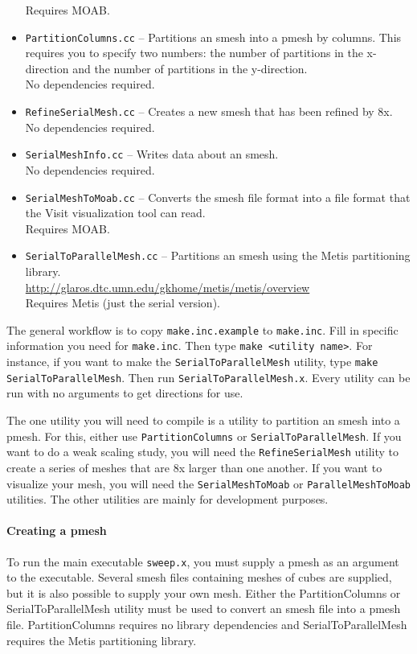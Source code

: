 \documentclass[12pt,letterpaper]{article}
\begin{document}
\begin{itemize}
{\color{red} Requires MOAB.}
\item {\tt PartitionColumns.cc} -- Partitions an smesh into a pmesh by columns.  This requires you to specify two numbers: the number of partitions in the x-direction and the number of partitions in the y-direction. \\
{\color{red} No dependencies required.}
\item {\tt RefineSerialMesh.cc} -- Creates a new smesh that has been refined by 8x.\\
{\color{red} No dependencies required.}
\item {\tt SerialMeshInfo.cc} -- Writes data about an smesh.\\
{\color{red} No dependencies required.}
\item {\tt SerialMeshToMoab.cc} -- Converts the smesh file format into a file format that the Visit visualization tool can read.\\
{\color{red} Requires MOAB.}
\item {\tt SerialToParallelMesh.cc} -- Partitions an smesh using the Metis partitioning library.\\
\url{http://glaros.dtc.umn.edu/gkhome/metis/metis/overview} \\
{\color{red} Requires Metis (just the serial version).}
\end{itemize}

The general workflow is to copy {\tt make.inc.example} to {\tt make.inc}.
Fill in specific information you need for {\tt make.inc}.
Then type {\tt make <utility name>}.
For instance, if you want to make the {\tt SerialToParallelMesh} utility, type {\tt make SerialToParallelMesh}.
Then run {\tt SerialToParallelMesh.x}.
Every utility can be run with no arguments to get directions for use.

The one utility you will need to compile is a utility to partition an smesh into a pmesh.
For this, either use {\tt PartitionColumns} or {\tt SerialToParallelMesh}.
If you want to do a weak scaling study, you will need the {\tt RefineSerialMesh} utility to create a series of meshes that are 8x larger than one another.
If you want to visualize your mesh, you will need the {\tt SerialMeshToMoab} or {\tt ParallelMeshToMoab} utilities.
The other utilities are mainly for development purposes.

\paragraph{Creating a pmesh}
To run the main executable {\tt sweep.x}, you must supply a pmesh as an argument to the executable.
Several smesh files containing meshes of cubes are supplied, but it is also possible to supply your own mesh.
Either the PartitionColumns or SerialToParallelMesh utility must be used to convert an smesh file into a pmesh file.
PartitionColumns requires no library dependencies and SerialToParallelMesh requires the Metis partitioning library.
\end{document}
